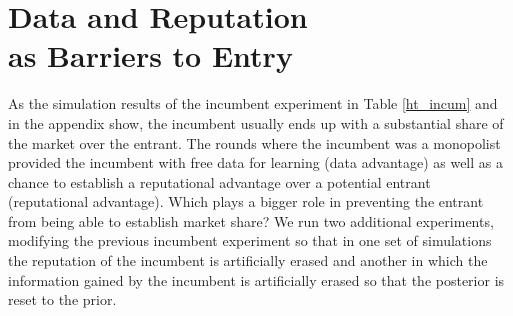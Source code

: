 \documentclass{article}
\theoremstyle{definition}
\begin{document}
\section{Data and Reputation \\ as Barriers to Entry}
\label{S:8}

As the simulation results of the incumbent experiment in Table \ref{ht_incum} and in the appendix show, the incumbent usually ends up with a substantial share of the market over the entrant. The rounds where the incumbent was a monopolist provided the incumbent with free data for learning (data advantage) as well as a chance to establish a reputational advantage over a potential entrant (reputational advantage). Which plays a bigger role in preventing the entrant from being able to establish market share? We run two additional experiments, modifying the previous incumbent experiment so that in one set of simulations the reputation of the incumbent is artificially erased and another in which the information gained by the incumbent is artificially erased so that the posterior is reset to the prior.
\end{document}
